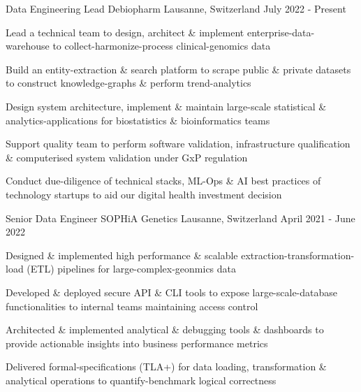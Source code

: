 

\begin{cventries}

\vspace{-0.3cm}
 \cventry
    {Data Engineering Lead} %
    {Debiopharm} %
    {Lausanne, Switzerland} %
    {July 2022 - Present} %
    {
      \begin{cvitems} %
        \item {Lead a technical team to design, architect \& implement enterprise-data-warehouse to collect-harmonize-process clinical-genomics data}
        \item {Build an entity-extraction \& search platform to scrape public \& private datasets to construct knowledge-graphs \& perform trend-analytics}
        \item {Design system architecture, implement \& maintain large-scale statistical \& analytics-applications for biostatistics \& bioinformatics teams}
        \item {Support quality team to perform software validation, infrastructure qualification \& computerised system validation under GxP regulation}
        \item {Conduct due-diligence of technical stacks, ML-Ops \& AI best practices of technology startups to aid our digital health investment decision}
      \end{cvitems}
    }

	
 \cventry
    {Senior Data Engineer} %
    {SOPHiA Genetics} %
    {Lausanne, Switzerland} %
    {April 2021 - June 2022} %
    {
      \begin{cvitems} %
        \item {Designed \& implemented high performance \& scalable extraction-transformation-load (ETL) pipelines for large-complex-geonmics data}
        \item {Developed \& deployed secure API \& CLI tools to expose large-scale-database functionalities to internal teams maintaining access control}
        \item {Architected \& implemented analytical \& debugging tools \& dashboards to provide actionable insights into business performance metrics}
        \item {Delivered formal-specifications (TLA+) for data loading, transformation \& analytical operations to quantify-benchmark logical correctness}
      \end{cvitems}
    }


\end{cventries}
